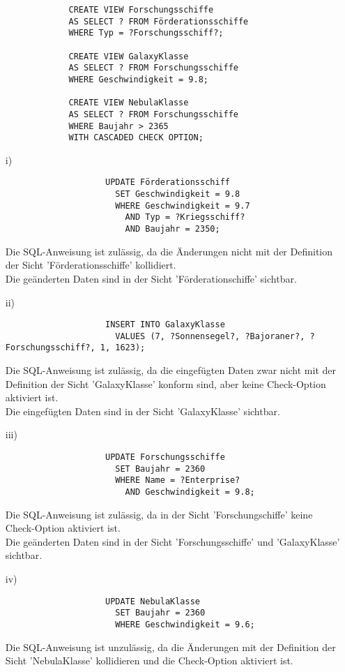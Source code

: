 \documentclass[a4paper,11pt,fleqn]{scrartcl}
\begin{document}
\begin{enumerate}
\begin{enumerate}
\begin{verbatim}
				CREATE VIEW Forschungsschiffe
				AS SELECT ? FROM Förderationsschiffe
				WHERE Typ = ?Forschungsschiff?;

				CREATE VIEW GalaxyKlasse
				AS SELECT ? FROM Forschungsschiffe
				WHERE Geschwindigkeit = 9.8;

				CREATE VIEW NebulaKlasse
				AS SELECT ? FROM Forschungsschiffe
				WHERE Baujahr > 2365
				WITH CASCADED CHECK OPTION;
			\end{verbatim}
			
			\newpage
			\begin{enumerate}
				\item[i)]
				\begin{verbatim}
					UPDATE Förderationsschiff
					  SET Geschwindigkeit = 9.8
					  WHERE Geschwindigkeit = 9.7
						AND Typ = ?Kriegsschiff?
						AND Baujahr = 2350;
				\end{verbatim}
				Die SQL-Anweisung ist zulässig, da die Änderungen nicht mit der Definition der Sicht 'Förderationsschiffe' kollidiert.\\
				Die geänderten Daten sind in der Sicht 'Förderationschiffe' sichtbar.

				\item[ii)]
				\begin{verbatim}
					INSERT INTO GalaxyKlasse
					  VALUES (7, ?Sonnensegel?, ?Bajoraner?, ?Forschungsschiff?, 1, 1623);
				\end{verbatim}
				Die SQL-Anweisung ist zulässig, da die eingefügten Daten zwar nicht mit der Definition der Sicht 'GalaxyKlasse' konform sind, aber keine Check-Option aktiviert ist.\\
				Die eingefügten Daten sind in der Sicht 'GalaxyKlasse' sichtbar.

				\item[iii)]
				\begin{verbatim}
					UPDATE Forschungsschiffe
					  SET Baujahr = 2360
					  WHERE Name = ?Enterprise?
						AND Geschwindigkeit = 9.8;
				\end{verbatim}
				Die SQL-Anweisung ist zulässig, da in der Sicht 'Forschungschiffe' keine Check-Option aktiviert ist.\\
				Die geänderten Daten sind in der Sicht 'Forschungsschiffe' und 'GalaxyKlasse' sichtbar.

				\item[iv)]
				\begin{verbatim}
					UPDATE NebulaKlasse
					  SET Baujahr = 2360
					  WHERE Geschwindigkeit = 9.6;
				\end{verbatim}
				Die SQL-Anweisung ist unzulässig, da die Änderungen mit der Definition der Sicht 'NebulaKlasse' kollidieren und die Check-Option aktiviert ist.


\end{enumerate}
\end{enumerate}
\end{enumerate}
\end{document}
